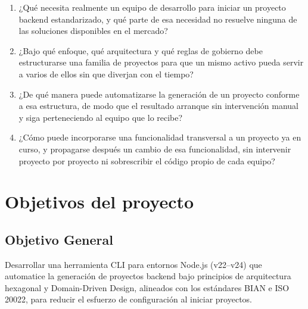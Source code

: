 \begin{enumerate}
\item ¿Qué necesita realmente un equipo de desarrollo para iniciar un
proyecto backend estandarizado, y qué parte de esa necesidad no resuelve
ninguna de las soluciones disponibles en el mercado?

\item ¿Bajo qué enfoque, qué arquitectura y qué reglas de gobierno debe
estructurarse una familia de proyectos para que un mismo activo pueda servir
a varios de ellos sin que diverjan con el tiempo?

\item ¿De qué manera puede automatizarse la generación de un proyecto
conforme a esa estructura, de modo que el resultado arranque sin
intervención manual y siga perteneciendo al equipo que lo recibe?

\item ¿Cómo puede incorporarse una funcionalidad transversal a un proyecto
ya en curso, y propagarse después un cambio de esa funcionalidad, sin
intervenir proyecto por proyecto ni sobrescribir el código propio de cada
equipo?
\end{enumerate}


\section{Objetivos del proyecto}

\subsection{Objetivo General}
Desarrollar una herramienta CLI para entornos Node.js (v22–v24) que automatice la generación de proyectos backend bajo principios de arquitectura hexagonal y Domain-Driven Design, alineados con los estándares BIAN e ISO 20022, para reducir el esfuerzo de configuración al iniciar proyectos.

